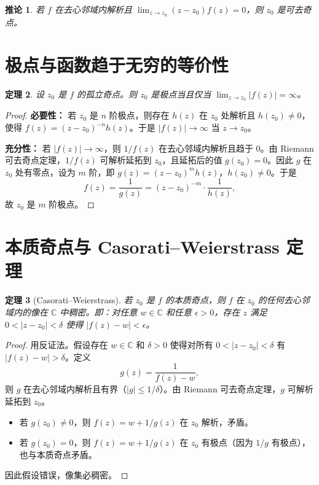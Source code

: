 \documentclass[UTF8]{ctexart}
\newtheorem{theorem}{定理}[section]
\newtheorem{corollary}[theorem]{推论}
\numberwithin{equation}{section}
\newcommand{\CC}{\mathbb{C}}
\begin{document}
\begin{corollary}
若 \(f\) 在去心邻域内解析且 \(\lim_{z\to z_0}(z-z_0)f(z)=0\)，则 \(z_0\) 是可去奇点。
\end{corollary}

\section{极点与函数趋于无穷的等价性}
\begin{theorem}\label{thm:pole}
设 \(z_0\) 是 \(f\) 的孤立奇点。则 \(z_0\) 是极点当且仅当 \(\lim_{z\to z_0}|f(z)| = \infty\)。
\end{theorem}

\begin{proof}
\textbf{必要性：} 若 \(z_0\) 是 \(n\) 阶极点，则存在 \(h(z)\) 在 \(z_0\) 处解析且 \(h(z_0)\neq0\)，使得 \(f(z)=(z-z_0)^{-n}h(z)\)。于是 \(|f(z)|\to\infty\) 当 \(z\to z_0\)。

\textbf{充分性：} 若 \(|f(z)|\to\infty\)，则 \(1/f(z)\) 在去心邻域内解析且趋于 \(0\)。由 Riemann 可去奇点定理，\(1/f(z)\) 可解析延拓到 \(z_0\)，且延拓后的值 \(g(z_0)=0\)。因此 \(g\) 在 \(z_0\) 处有零点，设为 \(m\) 阶，即 \(g(z)=(z-z_0)^m h(z)\)，\(h(z_0)\neq0\)。于是
\[
f(z) = \frac{1}{g(z)} = (z-z_0)^{-m} \cdot \frac{1}{h(z)},
\]
故 \(z_0\) 是 \(m\) 阶极点。
\end{proof}

\section{本质奇点与 Casorati–Weierstrass 定理}
\begin{theorem}[Casorati–Weierstrass]
若 \(z_0\) 是 \(f\) 的本质奇点，则 \(f\) 在 \(z_0\) 的任何去心邻域内的像在 \(\CC\) 中稠密。即：对任意 \(w\in\CC\) 和任意 \(\epsilon>0\)，存在 \(z\) 满足 \(0<|z-z_0|<\delta\) 使得 \(|f(z)-w|<\epsilon\)。
\end{theorem}

\begin{proof}
用反证法。假设存在 \(w\in\CC\) 和 \(\delta>0\) 使得对所有 \(0<|z-z_0|<\delta\) 有 \(|f(z)-w|>\delta\)。定义
\[
g(z) = \frac{1}{f(z)-w},
\]
则 \(g\) 在去心邻域内解析且有界（\(|g|\le 1/\delta\)）。由 Riemann 可去奇点定理，\(g\) 可解析延拓到 \(z_0\)。
\begin{itemize}
\item 若 \(g(z_0)\neq0\)，则 \(f(z)=w+1/g(z)\) 在 \(z_0\) 解析，矛盾。
\item 若 \(g(z_0)=0\)，则 \(f(z)=w+1/g(z)\) 在 \(z_0\) 有极点（因为 \(1/g\) 有极点），也与本质奇点矛盾。
\end{itemize}
因此假设错误，像集必稠密。
\end{proof}
\end{document}
